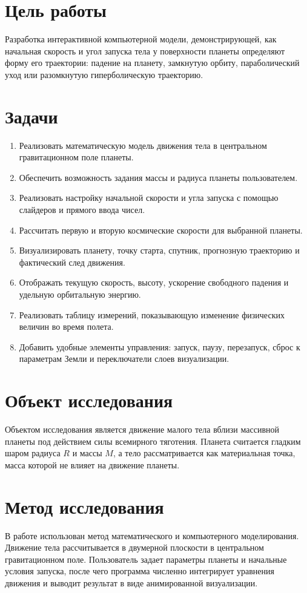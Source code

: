 \documentclass[12pt,a4paper]{article}
\begin{document}
\section{Цель работы}
Разработка интерактивной компьютерной модели, демонстрирующей, как начальная скорость и угол запуска тела у поверхности планеты определяют форму его траектории: падение на планету, замкнутую орбиту, параболический уход или разомкнутую гиперболическую траекторию.

\section{Задачи}
\begin{enumerate}
    \item Реализовать математическую модель движения тела в центральном гравитационном поле планеты.
    \item Обеспечить возможность задания массы и радиуса планеты пользователем.
    \item Реализовать настройку начальной скорости и угла запуска с помощью слайдеров и прямого ввода чисел.
    \item Рассчитать первую и вторую космические скорости для выбранной планеты.
    \item Визуализировать планету, точку старта, спутник, прогнозную траекторию и фактический след движения.
    \item Отображать текущую скорость, высоту, ускорение свободного падения и удельную орбитальную энергию.
    \item Реализовать таблицу измерений, показывающую изменение физических величин во время полета.
    \item Добавить удобные элементы управления: запуск, паузу, перезапуск, сброс к параметрам Земли и переключатели слоев визуализации.
\end{enumerate}

\section{Объект исследования}
Объектом исследования является движение малого тела вблизи массивной планеты под действием силы всемирного тяготения. Планета считается гладким шаром радиуса \(R\) и массы \(M\), а тело рассматривается как материальная точка, масса которой не влияет на движение планеты.

\section{Метод исследования}
В работе использован метод математического и компьютерного моделирования. Движение тела рассчитывается в двумерной плоскости в центральном гравитационном поле. Пользователь задает параметры планеты и начальные условия запуска, после чего программа численно интегрирует уравнения движения и выводит результат в виде анимированной визуализации.
\end{document}
